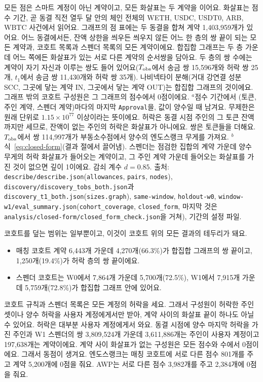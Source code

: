 \begin{table}[!htbp]
\begin{minipage}{\linewidth}\footnotesize\raggedright\vspace{0.4em}
모든 점은 스마트 계정이 아닌 계약이고, 모든 화살표는 두 계약을 이어요. 화살표는 점수 기간, 곧 동결 직전 열두 달 안의 체인 전체의 WETH, USDC, USDT0, ARB, WBTC 사건에서 읽어요. 그래프의 점 표에는 두 동결을 합쳐 계약 1,403,959개가 있어요. 어느 동결에서든, 잔액 상한을 씌우든 씌우지 않든 어느 한 층의 쌍 끝이 되는 모든 계약과, 코호트 목록과 스펜더 목록의 모든 계약이에요. 합집합 그래프는 두 층 가운데 어느 쪽에든 화살표가 있는 서로 다른 계약의 순서쌍을 담아요. 두 층의 쌍 수에는 계약이 자기 자신과 이루는 쌍도 들어 있어요($T_{\mathrm{obs}}$에서 송금 쌍 15,596개와 허락 쌍 25개, $t_1$에서 송금 쌍 11,430개와 허락 쌍 35개). 나비넥타이 분해(거대 강연결 성분 SCC, 그곳에 닿는 계약 IN, 그곳에서 닿는 계약 OUT)는 합집합 그래프의 것이에요. 그래프 밖의 코호트 구성원은 그 그래프의 점수에서 0점이에요. $^{a}$점수 기간에서 (토큰, 주인 계약, 스펜더 계약)마다의 마지막 \texttt{Approval}을, 값이 양수일 때 남겨요. 무제한은 원래 단위로 $1.15\times10^{77}$ 이상이라는 뜻이에요. 허락은 동결 시점 주인의 그 토큰 잔액까지만 세므로, 잔액이 없는 주인의 허락은 화살표가 아니에요. 쌍은 토큰들을 더해요. $T_{\mathrm{obs}}$에서 쌍 114,997개가 부동소수점에서 양수의 엔도스랭크 무게를 가져요. $^{b}$식~\eqref{eq:closed-form}(결과 절에서 끌어냄). 스펜더는 점검한 집합의 계약 가운데 양수 무게의 허락 화살표가 들어오는 계약이고, 그 주인 계약 가운데 들어오는 화살표를 가진 것이 없으면 깊이 1이에요. 감쇠 계수 $d=0.85$. 출처: \texttt{describe/describe.json}(\texttt{allowances}, \texttt{pairs}, \texttt{nodes}), \texttt{discovery/discovery\_tobs\_both.json}과 \texttt{discovery\_t1\_both.json}(\texttt{sizes.graph}), \texttt{same-window}, \texttt{holdout-w0}, \texttt{window-w1/eval\_summary.json}(\texttt{cohort\_coverage}, \texttt{closed\_form}, 마지막 것은 \texttt{analysis/closed-form/closed\_form\_check.json}을 거쳐), 기간의 설정 파일.
\end{minipage}
\end{table}

코호트를 덮는 범위는 일부뿐이고, 이것이 코호트 위의 모든 결과의 테두리가 돼요.
\begin{itemize}
\item 매칭 코호트 계약 6,443개 가운데 4,270개(66.3\%)가 합집합 그래프의 쌍 끝이고, 1,250개(19.4\%)가 허락 층의 쌍 끝이에요.
\item 스펜더 코호트는 W0에서 7,864개 가운데 5,700개(72.5\%), W1에서 7,915개 가운데 5,759개(72.8\%)가 합집합 그래프 안에 있어요.
\end{itemize}
코호트 규칙과 스펜더 목록은 모든 계정의 허락을 세요. 그래서 구성원이 허락한 주인 셋이나 양수 허락을 사용자 계정에게서만 받아, 계약 사이의 화살표 끝이 하나도 아닐 수 있어요. 허락은 대부분 사용자 계정에게서 와요. 동결 시점에 양수 마지막 허락을 가진 주인과 W1 스펜더의 쌍 3,809,524개 가운데 3,611,886개는 주인이 사용자 계정이고 197,638개는 계약이에요. 계약 사이 화살표가 없는 구성원은 모든 점수와 수에서 0점이에요. 그래서 동점이 생겨요. 엔도스랭크는 매칭 코호트에 서로 다른 점수 801개를 주고 계약 5,200개에 0점을 줘요. AWP는 서로 다른 점수 3,982개를 주고 2,384개에 0점을 줘요.


